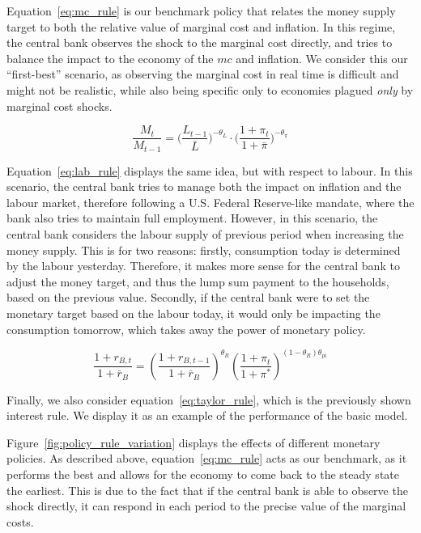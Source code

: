 \documentclass[12pt]{article}
\begin{document}
Equation~\ref{eq:mc_rule} is our benchmark policy that relates the money supply target to both the relative value of marginal cost and inflation. In this regime, the central bank observes the shock to the marginal cost directly, and tries to balance the impact to the economy of the $mc$ and inflation. We consider this our ``first-best'' scenario, as observing the marginal cost in real time is difficult and might not be realistic, while also being specific only to economies plagued \textit{only} by marginal cost shocks.

\begin{equation}\label{eq:lab_rule}
    \frac{M_t}{M_{t-1}}
        = \Big(\frac{L_{t-1}}{\bar{L}}\Big)^{-\theta_L}
          \cdot \Big(\frac{1 + \pi_t}{1 + \bar{\pi}}\Big)^{-\theta_{\pi}}
\end{equation}

Equation~\ref{eq:lab_rule} displays the same idea, but with respect to labour. In this scenario, the central bank tries to manage both the impact on inflation and the labour market, therefore following a U.S. Federal Reserve-like mandate, where the bank also tries to maintain full employment. However, in this scenario, the central bank considers the labour supply of previous period when increasing the money supply. This is for two reasons: firstly, consumption today is determined by the labour yesterday. Therefore, it makes more sense for the central bank to adjust the money target, and thus the lump sum payment to the households, based on the previous value. Secondly, if the central bank were to set the monetary target based on the labour today, it would only be impacting the consumption tomorrow, which takes away the power of monetary policy.  

\begin{equation}\label{eq:taylor_rule}
    \frac{1 + r_{B,t}}{1 + \bar{r}_B} = \left( \frac{1 + r_{B,t-1}}{1 + \bar{r}_B} \right)^{\theta_R} \left( \frac{1 + \pi_t}{1 + \pi^*} \right)^{(1 - \theta_R)\theta_{pi}}
\end{equation}

Finally, we also consider equation~\ref{eq:taylor_rule}, which is the previously shown interest rule. We display it as an example of the performance of the basic model.  


Figure~\ref{fig:policy_rule_variation} displays the effects of different monetary policies. As described above, equation~\ref{eq:mc_rule} acts as our benchmark, as it performs the best and allows for the economy to come back to the steady state the earliest. This is due to the fact that if the central bank is able to observe the shock directly, it can respond in each period to the precise value of the marginal costs.
\end{document}
